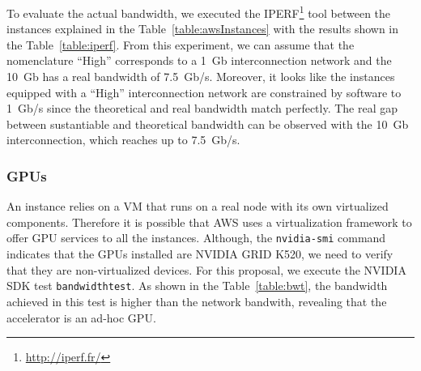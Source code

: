 \documentclass[a4paper,twoside]{article}
\begin{document}
To evaluate the actual bandwidth, we executed 
the IPERF\footnote{\url{http://iperf.fr/}} tool between the instances explained in 
the Table~\ref{table:awsInstances} with the results shown in the Table~\ref{table:iperf}.
From this experiment, we can assume that the nomenclature ``High'' corresponds to a 1~Gb interconnection network and the 10~Gb has 
a real bandwidth of 7.5~Gb/s.
Moreover, it looks like the instances equipped with a ``High'' interconnection network
are constrained by software to 1~Gb/s since the theoretical and real bandwidth 
match perfectly. The real gap between sustantiable and theoretical bandwidth can be observed with 
the 10~Gb interconnection, which reaches up to 7.5~Gb/s.


\subsubsection{GPUs}
An instance relies on a VM that runs on a real node with its own virtualized components. 
Therefore it is possible that AWS uses a virtualization framework to offer GPU services to all the instances.
Although, the {\tt nvidia-smi} command indicates that the GPUs installed are NVIDIA GRID K520, 
we need to verify that they are non-virtualized devices. For this proposal, we execute the NVIDIA SDK test {\tt bandwidthtest}. 
As shown in the Table~\ref{table:bwt}, the bandwidth achieved in this test is higher than the network bandwith, revealing that the accelerator is an ad-hoc GPU. 
\end{document}
